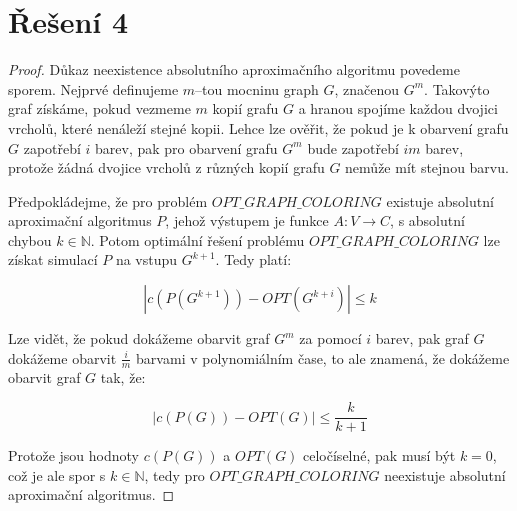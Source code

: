 \documentclass[a4paper, 11pt, fleqn]{scrartcl}
\begin{document}
 \section*{Řešení 4}
  \begin{proof}
    Důkaz neexistence absolutního aproximačního algoritmu povedeme sporem. Nejprvé definujeme $m$--tou mocninu graph $G$, značenou $G^m$. Takovýto graf získáme, pokud vezmeme $m$ kopií grafu $G$ a hranou spojíme každou dvojici vrcholů, které nenáleží stejné kopii. Lehce lze ověřit, že pokud je k obarvení grafu $G$ zapotřebí $i$ barev, pak pro obarvení grafu $G^m$ bude zapotřebí $im$ barev, protože žádná dvojice vrcholů z různých kopií grafu $G$ nemůže mít stejnou barvu.

    Předpokládejme, že pro problém $\mathit{OPT\_GRAPH\_COLORING}$ existuje absolutní aproximační algoritmus $P$, jehož výstupem je funkce $A : V \rightarrow C$, s absolutní chybou $k \in \mathbb{N}$. Potom optimální řešení problému $\mathit{OPT\_GRAPH\_COLORING}$ lze získat simulací $P$ na vstupu $G^{k+1}$. Tedy platí:

    $$ |c(P(G^{k+1})) - OPT(G^{k+i})| \leq k $$

    Lze vidět, že pokud dokážeme obarvit graf $G^{m}$ za pomocí $i$ barev, pak graf $G$ dokážeme obarvit $\frac{i}{m}$ barvami v polynomiálním čase, to ale znamená, že dokážeme obarvit graf $G$ tak, že:

    $$ |c(P(G)) - OPT(G)| \leq \frac{k}{k+1} $$

    Protože jsou hodnoty $c(P(G))$ a $OPT(G)$ celočíselné, pak musí být $k = 0$, což je ale spor s $k \in \mathbb{N}$, tedy pro $\mathit{OPT\_GRAPH\_COLORING}$ neexistuje absolutní aproximační algoritmus.

  \end{proof}
\end{document}
